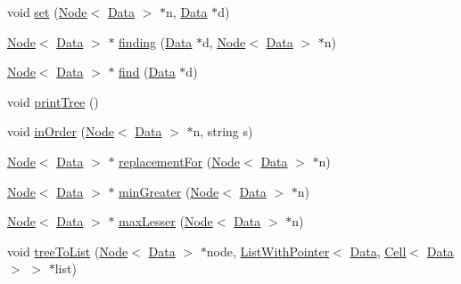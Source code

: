 \begin{DoxyCompactItemize}
\item 
void \hyperlink{classBinarySearchTree_a0b3fa4f1e1d76ced3cabe222ad4edfbd}{set} (\hyperlink{classNode}{Node}$<$ \hyperlink{main_8cpp_a0c209e815d35b218025a240523b4335b}{Data} $>$ $\ast$n, \hyperlink{main_8cpp_a0c209e815d35b218025a240523b4335b}{Data} $\ast$d)
\item 
\hyperlink{classNode}{Node}$<$ \hyperlink{main_8cpp_a0c209e815d35b218025a240523b4335b}{Data} $>$ $\ast$ \hyperlink{classBinarySearchTree_af68ea8fa6620026c26c5a5634382d032}{finding} (\hyperlink{main_8cpp_a0c209e815d35b218025a240523b4335b}{Data} $\ast$d, \hyperlink{classNode}{Node}$<$ \hyperlink{main_8cpp_a0c209e815d35b218025a240523b4335b}{Data} $>$ $\ast$n)
\item 
\hyperlink{classNode}{Node}$<$ \hyperlink{main_8cpp_a0c209e815d35b218025a240523b4335b}{Data} $>$ $\ast$ \hyperlink{classBinarySearchTree_ac560fff2205ef8633b9b35a5c1af568f}{find} (\hyperlink{main_8cpp_a0c209e815d35b218025a240523b4335b}{Data} $\ast$d)
\item 
void \hyperlink{classBinarySearchTree_a4f8f2ce34a8099962133e954122764fa}{print\+Tree} ()
\item 
void \hyperlink{classBinarySearchTree_a0414c50c1df9fc8522fe3a01ba46304f}{in\+Order} (\hyperlink{classNode}{Node}$<$ \hyperlink{main_8cpp_a0c209e815d35b218025a240523b4335b}{Data} $>$ $\ast$n, string s)
\item 
\hyperlink{classNode}{Node}$<$ \hyperlink{main_8cpp_a0c209e815d35b218025a240523b4335b}{Data} $>$ $\ast$ \hyperlink{classBinarySearchTree_a828682ddfca43a370878a76e4bf15925}{replacement\+For} (\hyperlink{classNode}{Node}$<$ \hyperlink{main_8cpp_a0c209e815d35b218025a240523b4335b}{Data} $>$ $\ast$n)
\item 
\hyperlink{classNode}{Node}$<$ \hyperlink{main_8cpp_a0c209e815d35b218025a240523b4335b}{Data} $>$ $\ast$ \hyperlink{classBinarySearchTree_a3daf2b4f29a3916c1a3a74889bb0dcc6}{min\+Greater} (\hyperlink{classNode}{Node}$<$ \hyperlink{main_8cpp_a0c209e815d35b218025a240523b4335b}{Data} $>$ $\ast$n)
\item 
\hyperlink{classNode}{Node}$<$ \hyperlink{main_8cpp_a0c209e815d35b218025a240523b4335b}{Data} $>$ $\ast$ \hyperlink{classBinarySearchTree_a9e12b403f7677f13b1a48df59c876a0d}{max\+Lesser} (\hyperlink{classNode}{Node}$<$ \hyperlink{main_8cpp_a0c209e815d35b218025a240523b4335b}{Data} $>$ $\ast$n)
\item 
void \hyperlink{classBinarySearchTree_a23a6f47f65ee7bbc663c0d71c2ea66de}{tree\+To\+List} (\hyperlink{classNode}{Node}$<$ \hyperlink{main_8cpp_a0c209e815d35b218025a240523b4335b}{Data} $>$ $\ast$node, \hyperlink{classListWithPointer}{List\+With\+Pointer}$<$ \hyperlink{main_8cpp_a0c209e815d35b218025a240523b4335b}{Data}, \hyperlink{classCell}{Cell}$<$ \hyperlink{main_8cpp_a0c209e815d35b218025a240523b4335b}{Data} $>$ $>$ $\ast$list)
\end{DoxyCompactItemize}
